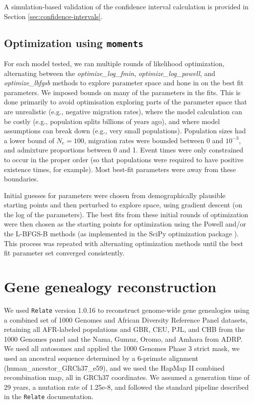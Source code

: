 \documentclass[]{article}
\newcommand{\moments}{\texttt{moments}\xspace}
\newcommand{\Relate}{\texttt{Relate}\xspace}
\begin{document}
A simulation-based validation of the confidence interval calculation is provided in Section 
\ref{sec:confidence-intervals}.

\subsection{Optimization using \moments}
\label{sec:optimization}

For each model tested, we ran multiple rounds of likelihood optimization,
alternating between the \emph{optimize\_log\_fmin},
\emph{optimize\_log\_powell}, and \emph{optimize\_lbfgsb} methods to explore
parameter space and hone in on the best fit parameters.  
We imposed bounds on many of the parameters in the fits.
This is done primarily to avoid optimisation exploring parts of the parameter space 
that are unrealistic (e.g., negative migration rates), where the model calculation can 
be costly (e.g., population splits billions of years ago), and where model assumptions 
can break down (e.g., very small populations).  Population sizes had a lower bound of 
$N_e=100$, migration rates were
bounded between 0 and $10^{-3}$, and admixture proportions between 0 and 1.
Event times were only constrained to occur in the proper order (so that
populations were required to have positive existence times, for example).
Most best-fit parameters were away from these boundaries.


Initial guesses for parameters were chosen from demographically plausible
starting points and then perturbed to explore space, using gradient descent (on
the log of the parameters). The best fits from these initial rounds of
optimization were then chosen as the starting points for optimization using the
Powell and/or the L-BFGS-B methods (as implemented in the SciPy optimization
package \citep{Virtanen2020-kr}). This process was repeated with alternating
optimization methods until the best fit parameter set converged consistently.

\section{Gene genealogy reconstruction}
\label{sec:relate}

We used \Relate version 1.0.16 \citep{Speidel2019-nj} to reconstruct genome-wide
gene genealogies using a combined set of 1000 Genomes and African Diversity
Reference Panel datasets, retaining all AFR-labeled populations and GBR, CEU,
PJL, and CHB from the 1000 Genomes panel and the Nama, Gumuz, Oromo, and Amhara
from ADRP. We used all autosomes and applied the 1000 Genomes Phase 3 strict
mask, we used an ancestral sequence determined by a 6-primate alignment
(human\_ancestor\_GRCh37\_e59), and we used the HapMap II combined
recombination map, all in GRCh37 coordinates. We assumed a generation time of
29 years, a mutation rate of 1.25e-8, and followed the standard pipeline
described in the \Relate documentation.
\end{document}
